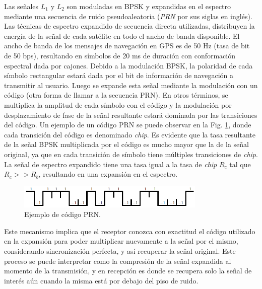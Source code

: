 \documentclass[a4paper,12pt,oneside,onecolumn,final,openright]{book}%
\begin{document}
	Las señales $L_1$ y $L_2$ son moduladas en BPSK y expandidas en el espectro mediante una secuencia de ruido pseudoaleatoria (\textit{PRN} por sus siglas en inglés). Las técnicas de espectro expandido de secuencia directa utilizadas, distribuyen la energía de la señal de cada satélite en todo el ancho de banda disponible. El ancho de banda de los mensajes de navegación en GPS es de 50 Hz (tasa de bit de 50 bps), resultando en símbolos de 20 ms de duración con conformación espectral dada por cajones. Debido a la modulación BPSK, la polaridad de cada símbolo rectangular estará dada por el bit de información de navegación a transmitir al usuario. Luego se expande esta señal mediante la modulación con un código (otra forma de llamar a la secuencia PRN). En otros términos, se multiplica la amplitud de cada símbolo con el código y la modulación por desplazamiento de fase de la señal resultante estará dominada por las transiciones del código. Un ejemplo de un código PRN se puede observar en la Fig. \ref{fig:PRN}, donde cada transición del código es denominado \textit{chip}. Es evidente que la tasa resultante de la señal BPSK multiplicada por el código es mucho mayor que la de la señal original, ya que en cada transición de símbolo tiene múltiples transiciones de \textit{chip}. La señal de espectro expandido tiene una tasa igual a la tasa de \textit{chip} $R_c$ tal que $R_c>>R_b$, resultando en una expansión en el espectro.
\begin{figure}[h]%
    \centering
    \includegraphics[width=0.8\textwidth]{GNSS/codigoPRN.png}
    \caption{Ejemplo de código PRN.}
    \label{fig:PRN}
\end{figure}

	Este mecanismo implica que el receptor conozca con exactitud el código utilizado en la expansión para poder multiplicar nuevamente a la señal por el mismo, considerando sincronización perfecta, y así recuperar la señal original. Este proceso se puede interpretar como la compresión de la señal expandida al momento de la transmisión, y en recepción es donde se recupera solo la señal de interés aún cuando la misma está por debajo del piso de ruido.
	
\end{document}
